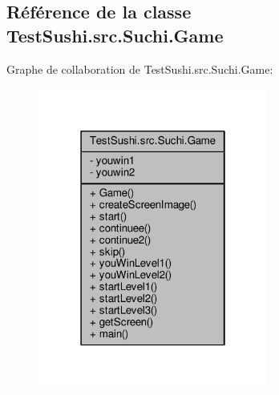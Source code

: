\hypertarget{classTestSushi_1_1src_1_1Suchi_1_1Game}{}\subsection{Référence de la classe Test\+Sushi.\+src.\+Suchi.\+Game}
\label{classTestSushi_1_1src_1_1Suchi_1_1Game}


Graphe de collaboration de Test\+Sushi.\+src.\+Suchi.\+Game\+:\nopagebreak
\begin{figure}[H]
\begin{center}
\leavevmode
\includegraphics[width=214pt]{classTestSushi_1_1src_1_1Suchi_1_1Game__coll__graph}
\end{center}
\end{figure}
